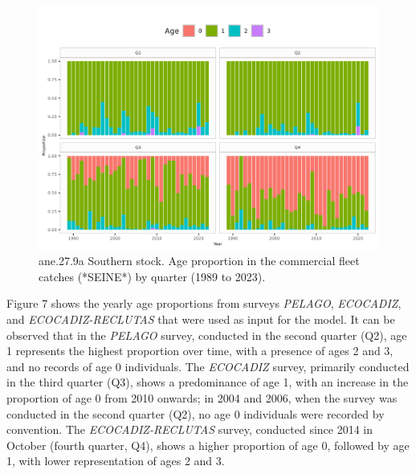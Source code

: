 \documentclass[
]{article}
\begin{document}
\begin{figure}[H]

{\centering \includegraphics[width=0.95\linewidth]{report/run/S1.0_4FLEETS_SelECO_RecIndex_Mnewfix/fig_agecomp_by_quartersSeine} 

}

\caption{ane.27.9a Southern stock. Age proportion in the commercial fleet catches (*SEINE*) by quarter (1989 to 2023).}\label{fig:unnamed-chunk-7}
\end{figure}

Figure 7 shows the yearly age proportions from surveys \emph{PELAGO},
\emph{ECOCADIZ}, and \emph{ECOCADIZ-RECLUTAS} that were used as input
for the model. It can be observed that in the \emph{PELAGO} survey,
conducted in the second quarter (Q2), age 1 represents the highest
proportion over time, with a presence of ages 2 and 3, and no records of
age 0 individuals. The \emph{ECOCADIZ} survey, primarily conducted in
the third quarter (Q3), shows a predominance of age 1, with an increase
in the proportion of age 0 from 2010 onwards; in 2004 and 2006, when the
survey was conducted in the second quarter (Q2), no age 0 individuals
were recorded by convention. The \emph{ECOCADIZ-RECLUTAS} survey,
conducted since 2014 in October (fourth quarter, Q4), shows a higher
proportion of age 0, followed by age 1, with lower representation of
ages 2 and 3.
\end{document}
